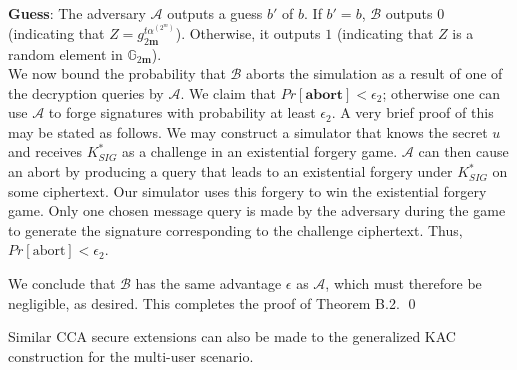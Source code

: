 \noindent \textbf{Guess}: The adversary $\mathcal{A}$ outputs a guess $b'$ of $b$. If $b' = b$, $\mathcal{B}$ outputs $0$ (indicating that $Z=g^{t\alpha^{(2^m)}}_{2\mathbf{m}}$). Otherwise, it outputs $1$ (indicating that $Z$ is a random element in $\mathbb{G}_{2\mathbf{m}}$).\\ 

\noindent We now bound the probability that $\mathcal{B}$ aborts the simulation as a result of one of the decryption queries by $\mathcal{A}$. We claim that $Pr[\textbf{abort}]<\epsilon_2$; otherwise one can use $\mathcal{A}$ to forge signatures with probability at least $\epsilon_2$. A very brief proof of this may be stated as follows. We may construct a simulator that knows the secret $u$ and receives $K^{*}_{SIG}$ as a challenge in an existential forgery game. $\mathcal{A}$ can then cause an abort by producing a query that leads to an existential forgery under $K^{*}_{SIG}$ on some ciphertext. Our simulator uses this forgery to win the existential forgery game. Only one chosen message query is made by the adversary during the game to generate the signature corresponding to the challenge ciphertext. Thus, $Pr[\text{abort}]<\epsilon_2$.

We conclude that $\mathcal{B}$ has the same advantage $\epsilon$ as $\mathcal{A}$, which must therefore be negligible, as desired. This completes the proof of Theorem B.2. \hfill\qed

Similar CCA secure extensions can also be made to the generalized KAC construction for the multi-user scenario.


